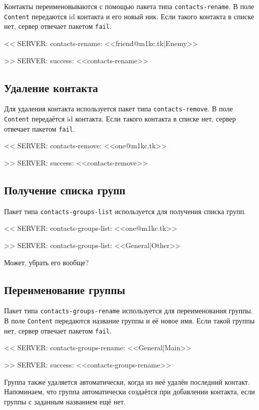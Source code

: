 \documentclass[a4paper,12pt]{book}
\begin{document}
Контакты переименовываются с помощью пакета типа \texttt{contacts-rename}. В поле \texttt{Content} передаются id контакта и его новый ник. Если такого контакта в списке нет, сервер отвечает пакетом \texttt{fail}.

{\ttfamily
<{}< SERVER: contacts-rename: <<friend@m1kc.tk|Enemy>>

>{}> SERVER: success: <<contacts-rename>>
}

\subsection{Удаление контакта}

Для удаления контакта используется пакет типа \texttt{contacts-remove}. В поле \texttt{Content} передаётся id контакта. Если такого контакта в списке нет, сервер отвечает пакетом \texttt{fail}.

{\ttfamily
<{}< SERVER: contacts-remove: <<one@m1kc.tk>>

>{}> SERVER: success: <<contacts-remove>>
}

\subsection{Получение списка групп}

Пакет типа \texttt{contacts-groups-list} используется для получения списка групп.

{\ttfamily
<{}< SERVER: contacts-groups-list: <<one@m1kc.tk>>

>{}> SERVER: contacts-groups-list: <<General|Other>>
}

Может, убрать его вообще?

\subsection{Переименование группы}

Пакет типа \texttt{contacts-groups-rename} используется для переименования группы. В поле \texttt{Content} передаются название группы и её новое имя. Если такой группы нет, сервер отвечает пакетом \texttt{fail}.

{\ttfamily
<{}< SERVER: contacts-groups-rename: <<General|Main>>

>{}> SERVER: success: <<contacts-groups-rename>>
}

Группа также удаляется автоматически, когда из неё удалён последний контакт. Напоминаем, что группа автоматически создаётся при добавлении контакта, если группы с заданным названием ещё нет.
\end{document}
